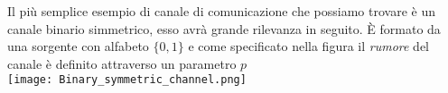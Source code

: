 \begin{oss} \label{oss:bsc}
Il più semplice esempio di canale di comunicazione che possiamo trovare è un canale binario simmetrico, esso avrà grande rilevanza in seguito. È formato da una sorgente  con alfabeto $\{ 0 , 1 \}$ e come specificato nella figura il \textit{rumore} del canale è definito attraverso un parametro $p$
\\


\texttt{[image: Binary\_symmetric\_channel.png]} \label{fig:bsc}
\\


\end{oss}
